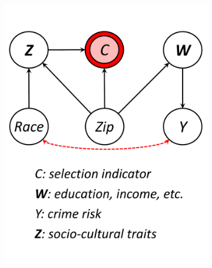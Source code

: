 \documentclass[11pt]{article}
\begin{document}
\begin{figure}[t]
\begin{subfigure}[b]{0.24\textwidth}
   \includegraphics[width=\linewidth]{submissions/submission5/figs/selection-bias.pdf}
   \vspace{-.5cm}
   \caption{}
   \label{fig:selection-bias}
\end{subfigure}
\hfill
\begin{subfigure}[b]{0.24\textwidth}

\end{subfigure}
\end{figure}
\end{document}
